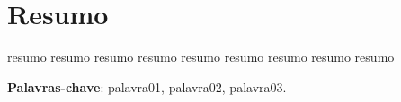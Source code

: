 \chapter*{\centering Resumo}
resumo resumo resumo
resumo resumo resumo
resumo resumo resumo

\vspace{.5cm}
\textbf{Palavras-chave}:
palavra01, palavra02, palavra03.
